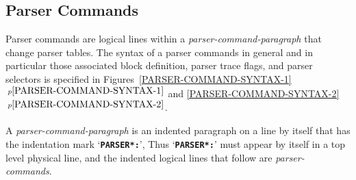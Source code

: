 \documentclass[12pt]{article}
\newcommand{\TT}[1]{{\tt \bfseries #1}}
\newcommand{\itemref}[1]{\ref{#1}$\,^{p\pageref{#1}}$}
\begin{document}
\subsection{Parser Commands}
\label{PARSER-COMMANDS}

Parser commands are logical lines within a {\em parser-command-paragraph}
that change parser tables.
The syntax of a parser commands in general and in particular those
associated block definition, parser trace flags, and parser selectors
is specified in Figures~\itemref{PARSER-COMMAND-SYNTAX-1}
and \itemref{PARSER-COMMAND-SYNTAX-2}.

A {\em parser-command-paragraph} is an indented paragraph on a line by itself
that has the indentation mark `\TT{*PARSER*:}',
Thus `\TT{*PARSER*:}' must appear by itself in a top level
physical line, and the indented logical lines that follow are
{\em parser-commands}.
\end{document}
